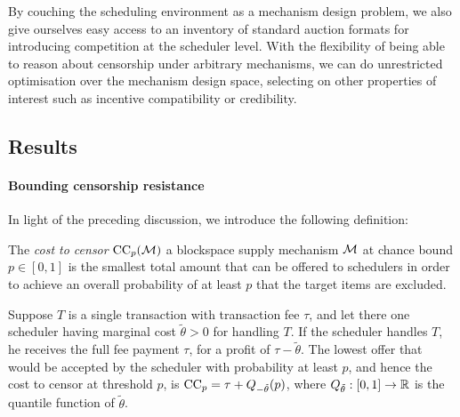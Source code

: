 By couching the scheduling environment as a mechanism design problem, we also give ourselves easy access to an inventory of standard auction formats for introducing competition at the scheduler level.
%
With the flexibility of being able to reason about censorship under arbitrary mechanisms, we can do unrestricted optimisation over the mechanism design space, selecting on other properties of interest such as incentive compatibility or credibility.



\subsection{Results}
\paragraph{Bounding censorship resistance}

In light of the preceding discussion, we introduce the following definition:

\begin{definition}

  The \emph{cost to censor} $\mathrm{CC}_{p}(\mathcal{M})$ a blockspace supply mechanism $\mathcal{M}$ at chance bound $p\in[0,1]$ is the smallest total amount that can be offered to schedulers in order to achieve an overall probability of at least $p$ that the target items are excluded.

\end{definition}




\begin{example}

  Suppose $T$ is a single transaction with transaction fee $\tau$, and let there one scheduler having marginal cost $\tilde{\theta}>0$ for handling $T$.
  If the scheduler handles $T$, he receives the full fee payment $\tau$, for a profit of $\tau-\tilde{\theta}$.
  The lowest offer that would be accepted by the scheduler with probability at least $p$, and hence the cost to censor at threshold $p$, is $\mathrm{CC}_{p}=\tau+Q_{-\tilde{\theta}}(p)$, where $Q_{\tilde{\theta}}:[0,1]\rightarrow\mathbb{R}$ is the quantile function of $\tilde{\theta}$.

\end{example}


